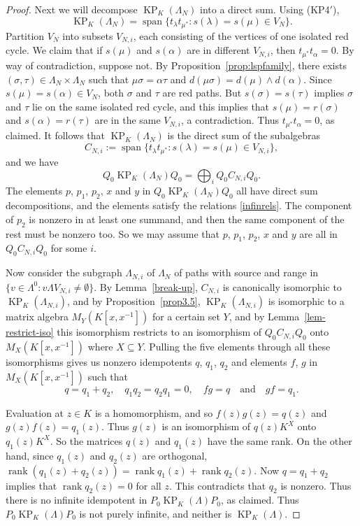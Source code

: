 \documentclass[a4paper,12pt]{amsart}
\numberwithin{equation}{section}
\theoremstyle{definition}
\theoremstyle{remark}
\begin{document}
\begin{proof}
Next we will decompose $\operatorname{KP}_K(\Lambda_N)$ into a direct sum. Using (KP4$'$), \[\operatorname{KP}_K(\Lambda_N)={\operatorname{\mathrm{span}}}\{t_\lambda t_{\mu^*}:s(\lambda)=s(\mu)\in V_N\}.\] 
Partition $V_N$ into subsets $V_{N,i}$, each consisting of the vertices of one isolated red cycle. We claim that if   $s(\mu)$ and $s(\alpha)$ are in different $V_{N,i}$, then $t_{\mu^*}t_\alpha=0$. By way of contradiction, suppose not. By Proposition~\ref{prop:lspfamily}, there exists $(\sigma,\tau)\in\Lambda_N\times\Lambda_N$ such that $\mu\sigma=\alpha\tau$ and $d(\mu\sigma)=d(\mu)\wedge d(\alpha)$.  Since $s(\mu)=s(\alpha)\in V_N$, both $\sigma$ and $\tau$ are red paths.  But $s(\sigma)=s(\tau)$ implies $\sigma$ and $\tau$ lie on the same isolated red cycle, and this implies that $s(\mu)=r(\sigma)$ and $s(\alpha)=r(\tau)$ are in the same $V_{N,i}$, a contradiction.   Thus $t_{\mu^*}t_\alpha=0$, as claimed.  It follows that $\operatorname{KP}_K(\Lambda_N)$ is the direct sum of the subalgebras
\[
C_{N,i}:={\operatorname{\mathrm{span}}}\{t_\lambda t_{\mu^*}:s(\lambda)=s(\mu)\in V_{N,i}\},
\]
and we have
\[Q_0\operatorname{KP}_K(\Lambda_N)Q_0=\bigoplus_i Q_0C_{N,i}Q_0.\] 
The elements $p$, $p_1$, $p_2$, $x$ and $y$ in $Q_0\operatorname{KP}_K(\Lambda_N)Q_0$ all have direct sum decompositions, and the elements satisfy the relations \eqref{infinrels}. The component of $p_2$ is nonzero in at least one summand, and then the same component of the rest must be nonzero too. So we may assume that $p$, $p_1$, $p_2$, $x$ and $y$  are all in $Q_0C_{N,i}Q_0$ for some $i$.

Now consider the subgraph $\Lambda_{N,i}$ of $\Lambda_N$ of paths with source and range in $\{v\in \Lambda^{0}: v\Lambda V_{N,{{{i}}}}\neq \emptyset\}$. By Lemma~\ref{break-up}, $C_{N,i}$ is canonically isomorphic to $\operatorname{KP}_K(\Lambda_{N,i})$, and by Proposition~\ref{prop3.5}, $\operatorname{KP}_K(\Lambda_{N,i})$ is isomorphic to a matrix algebra $M_Y(K[x,x^{-1}])$ for a certain set $Y$, and by Lemma~\ref{lem-restrict-iso} this isomorphism restricts to an isomorphism of  $Q_0C_{N,i}Q_0$ onto $M_X(K[x,x^{-1}])$ where $X\subseteq Y$.
 Pulling the five elements through all these isomorphisms gives us nonzero idempotents $q$, $q_1$, $q_2$ and elements $f$, $g$ in $M_X(K[x,x^{-1}])$ such that
\[
q=q_1+q_2,\quad q_1q_2=q_2q_1=0,\quad fg=q\quad \text{and}\quad gf=q_1.
\]

Evaluation at $z\in K$ is a homomorphism, and so  $f(z)g(z)=q(z)$ and $g(z)f(z)=q_1(z)$.  Thus $g(z)$ is an isomorphism of $q(z)K^X$ onto $q_1(z)K^X$. So the matrices $q(z)$ and $q_1(z)$ have the same rank. On the other hand, since $q_1(z)$ and $q_2(z)$ are orthogonal, ${\operatorname{\mathrm{rank}}}(q_1(z)+q_2(z))={\operatorname{\mathrm{rank}}} q_1(z)+{\operatorname{\mathrm{rank}}} q_2(z)$. Now  $q=q_1+q_2$ implies that ${\operatorname{\mathrm{rank}}} q_2(z)=0$ for all $z$. This contradicts that $q_2$ is nonzero. Thus there is no infinite idempotent  in $P_0\operatorname{KP}_K(\Lambda)P_0$, as claimed. Thus $P_0\operatorname{KP}_K(\Lambda)P_0$ is not purely infinite, and neither is $\operatorname{KP}_K(\Lambda)$. 
\end{proof}
\end{document}
